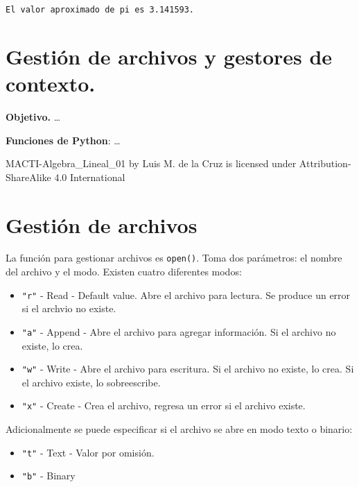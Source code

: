 \documentclass[
  letterpaper,
  DIV=11,
  numbers=noendperiod]{scrreprt}
\providecommand{\tightlist}{%
  \setlength{\itemsep}{0pt}\setlength{\parskip}{0pt}}\usepackage{longtable,booktabs,array}
\begin{document}
\begin{verbatim}
El valor aproximado de pi es 3.141593.
\end{verbatim}


\chapter{Gestión de archivos y gestores de
contexto.}\label{gestiuxf3n-de-archivos-y-gestores-de-contexto.}

\textbf{Objetivo.} \ldots{}

\textbf{Funciones de Python}: \ldots{}

MACTI-Algebra\_Lineal\_01 by Luis M. de la Cruz is licensed under
Attribution-ShareAlike 4.0 International


\chapter{Gestión de archivos}\label{gestiuxf3n-de-archivos}

La función para gestionar archivos es \texttt{open()}. Toma dos
parámetros: el nombre del archivo y el modo. Existen cuatro diferentes
modos:

\begin{itemize}
\tightlist
\item
  \texttt{"r"} - Read - Default value. Abre el archivo para lectura. Se
  produce un error si el archvio no existe.
\item
  \texttt{"a"} - Append - Abre el archivo para agregar información. Si
  el archivo no existe, lo crea.
\item
  \texttt{"w"} - Write - Abre el archivo para escritura. Si el archivo
  no existe, lo crea. Si el archivo existe, lo sobreescribe.
\item
  \texttt{"x"} - Create - Crea el archivo, regresa un error si el
  archivo existe.
\end{itemize}

Adicionalmente se puede especificar si el archivo se abre en modo texto
o binario:

\begin{itemize}
\tightlist
\item
  \texttt{"t"} - Text - Valor por omisión.
\item
  \texttt{"b"} - Binary
\end{itemize}
\end{document}
